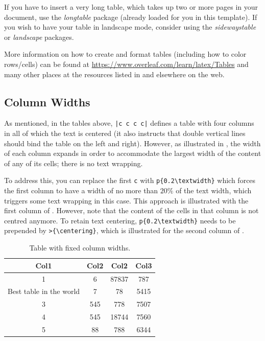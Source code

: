 If you have to insert a very long table, which takes up two or more pages in your document, use the \emph{longtable} package (already loaded for you in this template). If you wish to have your table in landscape mode, consider using the \emph{sidewaystable} or \emph{landscape} packages.  

More information on how to create and format tables (including how to color rows/cells) can be found at \url{https://www.overleaf.com/learn/latex/Tables} and many other places at the resources listed in  and elsewhere on the web.




\subsection{Column Widths}
\label{sec:TableColumnWidths}

As mentioned, in the tables above, \verb!|c c c c|! defines a table with four columns in all of which the text is centered (it also instructs that double vertical lines should bind the table on the left and right).
However, as illustrated in , the width of each column expands in order to accommodate the largest width of the content of any of its cells; there is no text wrapping.

To address this, you can replace the first \verb|c| with \verb|p{0.2\textwidth}| which forces the first column to have a width of no more than $20\%$ of the text width, which triggers some text wrapping in this case.
This approach is illustrated with the first column of .
However, note that the content of the cells in that column is not centred anymore. 
To retain text centering, \verb|p{0.2\textwidth}| needs to be prepended by \verb|>{\centering}|, which is illustrated for the second column of .

\begin{table}[!ht]
    \centering
    \caption{Table with fixed column widths.}
    \label{tab:MyThirdTable1}
    \begin{tabular}{|c c c c|} 
    \hline
    Col1 & Col2 & Col2 & Col3 \\
    \hline
    1 & 6 & 87837 & 787 \\  
    Best table in the world & 7 & 78 & 5415 \\ 
    3 & 545 & 778 & 7507 \\
    4 & 545 & 18744 & 7560 \\
    5 & 88 & 788 & 6344 \\
    \hline
    \end{tabular}
\end{table}

